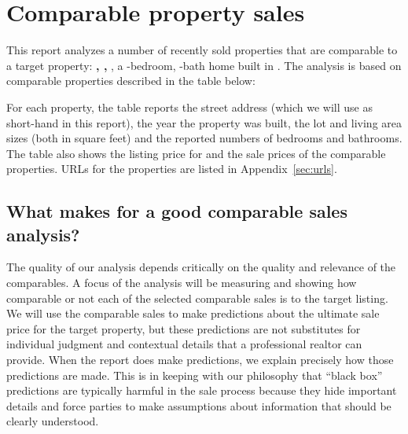 \documentclass[
12pt, %
letterpaper, %
oneside, %
headinclude,footinclude, %
BCOR5mm, %
]{scrartcl}
\begin{document}


\section{Comparable property sales}
This report analyzes a number of recently sold properties that are comparable to a target property:
\textbf{\PropertyName{}, \PropertyCity{}, \PropertyState{}}, a \NumberOfBedrooms{}-bedroom, \NumberOfBaths{}-bath  \PropertyType{} home built in \PropertyYearBuilt{}.
\TypeWarning{}
The analysis is based on \NumberOfComps{} comparable properties described in the table below:

\begin{small}

\end{small}

For each property, the table reports the street address (which we will use as short-hand in this report), the year the property was built, the lot and living area sizes (both in square feet) and the reported numbers of bedrooms and bathrooms. The table also shows the listing price for \PropertyName{} and the sale prices of the comparable properties.
URLs for the properties are listed in Appendix~\ref{sec:urls}.

\subsection{What makes for a good comparable sales analysis?}
The quality of our analysis depends critically on the quality and relevance of the comparables.
A focus of the analysis will be measuring and showing how comparable or not each of the selected comparable sales is to the target listing.
We will use the comparable sales to make predictions about the ultimate sale price for the target property, but these predictions are not substitutes for individual judgment and contextual details that a professional realtor can provide.
When the report does make predictions, we explain precisely how those predictions are made.
This is in keeping with our philosophy that ``black box'' predictions are typically harmful in the sale process because they hide important details and force parties to make assumptions about information that should be clearly understood.
\end{document}
